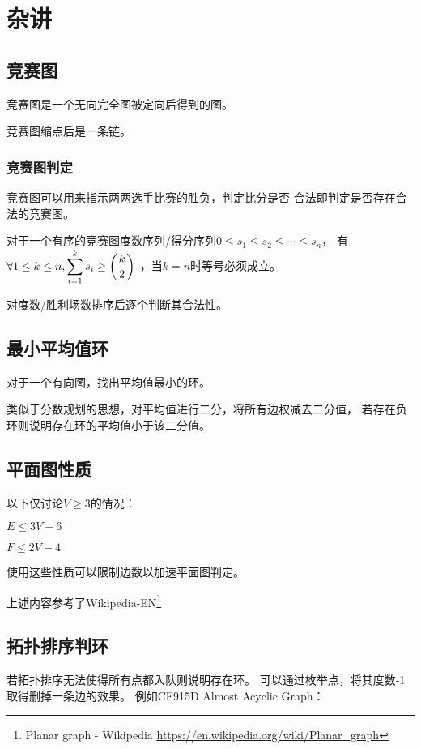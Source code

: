 \section{杂讲}
\subsection{竞赛图}
竞赛图是一个无向完全图被定向后得到的图。
\begin{theorem}
	竞赛图缩点后是一条链。
\end{theorem}
\subsubsection{竞赛图判定}
竞赛图可以用来指示两两选手比赛的胜负，判定比分是否
合法即判定是否存在合法的竞赛图。
\begin{theorem}
	对于一个有序的竞赛图度数序列/得分序列$0\leq s_1 \leq s_2 \leq \cdots \leq s_n$，
	有$\displaystyle \forall 1\leq k\leq n,\sum_{i=1}^k{s_i}\geq \left(k \atop 2\right)$
	，当$k=n$时等号必须成立。
\end{theorem}
对度数/胜利场数排序后逐个判断其合法性。
\subsection{最小平均值环}
对于一个有向图，找出平均值最小的环。

类似于分数规划的思想，对平均值进行二分，将所有边权减去二分值，
若存在负环则说明存在环的平均值小于该二分值。
\subsection{平面图性质}
以下仅讨论$V\geq 3$的情况：
\begin{property}
	$E\leq 3V-6$
\end{property}
\begin{property}
	$F\leq 2V-4$
\end{property}
使用这些性质可以限制边数以加速平面图判定。

上述内容参考了Wikipedia-EN\footnote{Planar graph - Wikipedia
	\url{https://en.wikipedia.org/wiki/Planar\_graph}
}
\subsection{拓扑排序判环}
若拓扑排序无法使得所有点都入队则说明存在环。
可以通过枚举点，将其度数-1取得删掉一条边的效果。
例如CF915D Almost Acyclic Graph：

